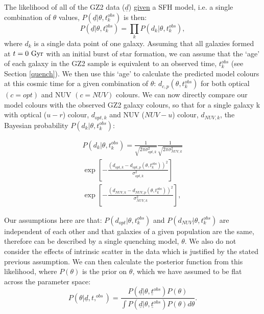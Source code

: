 \documentclass{mn2e}
\begin{document}
The likelihood of all of the GZ2 data ($\underline{d}$) \underline{given} a SFH model, i.e. a single combination of $\theta$ values, $P(\underline{d}|\theta, t_{k}^{obs})$ is then:
\begin{equation}
P(\underline{d}|\theta, t_{k}^{obs}) = \prod_{k} P(d_{k}|\theta, t_{k}^{obs}),
\end{equation}
where $d_{k}$ is a single data point of one galaxy. Assuming that all galaxies formed at $t=0~\rm{Gyr}$ with an initial burst of star formation, we can assume that the `age' of each galaxy in the GZ2 sample is equivalent to an observed time, $t^{obs}_{k}$ (see Section \ref{quench}). We then use this  `age' to calculate the predicted model colours at this cosmic time for a given combination of $\theta$: $d_{c,p}(\theta, t^{obs}_{k})$ for both optical $(c=opt)$ and NUV $(c=NUV)$ colours. We can now directly compare our model colours with the observed GZ2 galaxy colours, so that for a single galaxy k with optical ($u-r$) colour, $d_{opt, k}$ and NUV ($NUV-u$) colour, $d_{NUV,k}$, the Bayesian probability $P(d_{k}|\theta, t^{obs}_{k})$:


\begin{multline}\label{like}
P(d_{k}|\theta, t^{obs}_{k}) = \frac{1}{\sqrt{2\pi\sigma_{opt, k}^2}}\frac{1}{\sqrt{2\pi\sigma_{NUV, k}^2}} \\ \exp{\left[ - \frac{(d_{opt, k} - d_{opt, p}(\theta, t_{k}^{obs}))^2}{\sigma_{opt, k}^2} \right]} \\ \exp{\left[ - \frac{(d_{NUV, k} - d_{NUV, p}(\theta, t_{k}^{obs}))^2}{\sigma_{NUV, k}^2} \right]},
\end{multline}

Our assumptions here are that: $P(d_{opt}|\theta, t^{obs}_{k})$ and $P(d_{NUV}|\theta, t^{obs}_{k})$ are independent of each other and that galaxies of a given population are the same, therefore can be described by a single quenching model, $\theta$. We also do not consider the effects of intrinsic scatter in the data which is justified by the stated previous assumption. 
%
We can then calculate the posterior function from this likelihood, where $P(\theta)$ is the prior on $\theta$, which we have assumed to be flat across the parameter space:
\begin{equation}\label{big}
P(\theta|\underline{d}, t,^{obs}) = \frac{P(\underline{d}|\theta, \underline{t}^{obs})P(\theta)}{\int P(\underline{d}|\theta, \underline{t}^{obs})P(\theta) d\theta}.
\end{equation}
\end{document}
